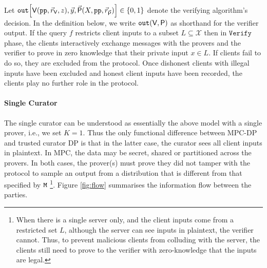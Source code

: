 Let $\mathtt{out}\Big[\mathsf{V}(\texttt{pp}, \vec{r}_{\mathsf{V}}, z), \vec{y}, \vec{\mathsf{P}}(X, \texttt{pp}, \vec{r}_{\vec{\mathsf{P}}})\Big] \in \{ 0, 1\}$ denote the verifying algorithm's decision.
In the definition below, we write $\mathtt{out}(\mathsf{V}, \mathsf{P})$ as shorthand for the verifier output.
If the query $f$ restricts client inputs to a subset $L \subseteq \mathcal{X}$ then in $\texttt{Verify}$ phase, the clients interactively exchange messages with the provers and the verifier to prove in zero knowledge that their private input $x \in L$. If clients fail to do so, they are excluded from the protocol. 
Once dishonest clients with illegal inputs have been excluded and honest client inputs have been recorded, the clients play no further role in the protocol. \par



\paragraph{Single Curator}
The single curator can be understood as
essentially the above model with a single prover, i.e., we set $K=1$.  Thus
the only functional difference between MPC-DP and trusted curator DP
is that in the latter case, the curator sees all client inputs in plaintext. 
In MPC, the data may be secret, shared or partitioned
across the provers. 
In both cases, the prover(s) must prove they did not tamper with the protocol to sample an output from a distribution that is different from that specified by $\mathtt{M}$ \footnote{When there is a single server only, and the client inputs come from a restricted set $L$, although the server can see inputs in plaintext, the verifier cannot. Thus, to prevent malicious clients from colluding with the server, the clients still need to prove to the verifier with zero-knowledge that the inputs are legal.}. Figure \ref{fig:flow} summarises the information flow between the parties.

